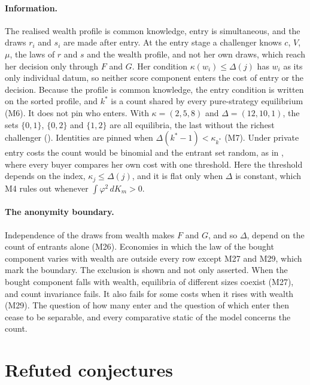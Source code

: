 \paragraph{Information.} The realised wealth profile is common knowledge,
entry is simultaneous, and the draws $r_i$ and $s_i$ are made after entry. At
the entry stage a challenger knows $c$, $V$, $\mu$, the laws of $r$ and $s$
and the wealth profile, and not her own draws, which reach her decision only
through $F$ and $G$. Her condition $\kappa(w_i)\le\Delta(j)$ has $w_i$ as its
only individual datum, so neither score component enters the cost of entry or
the decision. Because the profile is common knowledge, the entry condition is
written on the sorted profile, and $k^*$ is a count shared by every
pure-strategy equilibrium (M6). It does not pin who enters. With
$\kappa=(2,5,8)$ and $\Delta=(12,10,1)$, the sets $\{0,1\}$, $\{0,2\}$ and
$\{1,2\}$ are all equilibria, the last without the richest challenger
(). Identities are pinned when
$\Delta(k^*-1)<\kappa_{k^*}$ (M7). Under private entry costs the count would be
binomial and the entrant set random, as in \citet{MorenoWooders2011}, where
every buyer compares her own cost with one threshold. Here the threshold
depends on the index, $\kappa_j\le\Delta(j)$, and it is flat only when $\Delta$
is constant, which M4 rules out whenever $\int\varphi^2\,dK_m>0$.

\paragraph{The anonymity boundary.} Independence of the draws from wealth makes
$F$ and $G$, and so $\Delta$, depend on the count of entrants alone (M26).
Economies in which the law of the bought component varies with wealth are
outside every row except M27 and M29, which mark the boundary. The exclusion is
shown and not only asserted. When the bought component falls with wealth,
equilibria of different sizes coexist (M27), and count invariance fails. It also
fails for some costs when it rises with wealth (M29). The question of how many enter and the question of which
enter then cease to be separable, and every comparative static of the model
concerns the count.

\section{Refuted conjectures}
\label{app:refuted}

